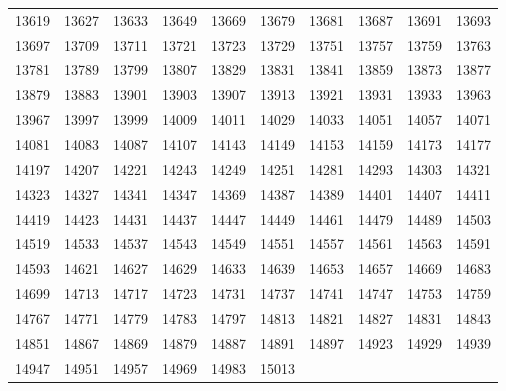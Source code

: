 \begin{longtable}{llllllllll}
13619	&	13627	&	13633	&	13649	&	13669	&	13679	&	13681	&	13687	&	13691	&	13693	\\
13697	&	13709	&	13711	&	13721	&	13723	&	13729	&	13751	&	13757	&	13759	&	13763	\\
13781	&	13789	&	13799	&	13807	&	13829	&	13831	&	13841	&	13859	&	13873	&	13877	\\
13879	&	13883	&	13901	&	13903	&	13907	&	13913	&	13921	&	13931	&	13933	&	13963	\\
13967	&	13997	&	13999	&	14009	&	14011	&	14029	&	14033	&	14051	&	14057	&	14071	\\
14081	&	14083	&	14087	&	14107	&	14143	&	14149	&	14153	&	14159	&	14173	&	14177	\\
14197	&	14207	&	14221	&	14243	&	14249	&	14251	&	14281	&	14293	&	14303	&	14321	\\
14323	&	14327	&	14341	&	14347	&	14369	&	14387	&	14389	&	14401	&	14407	&	14411	\\
14419	&	14423	&	14431	&	14437	&	14447	&	14449	&	14461	&	14479	&	14489	&	14503	\\
14519	&	14533	&	14537	&	14543	&	14549	&	14551	&	14557	&	14561	&	14563	&	14591	\\
14593	&	14621	&	14627	&	14629	&	14633	&	14639	&	14653	&	14657	&	14669	&	14683	\\
14699	&	14713	&	14717	&	14723	&	14731	&	14737	&	14741	&	14747	&	14753	&	14759	\\
14767	&	14771	&	14779	&	14783	&	14797	&	14813	&	14821	&	14827	&	14831	&	14843	\\
14851	&	14867	&	14869	&	14879	&	14887	&	14891	&	14897	&	14923	&	14929	&	14939	\\
14947	&	14951	&	14957	&	14969	&	14983	&	15013									\\
	\bottomrule 
\end{longtable}
